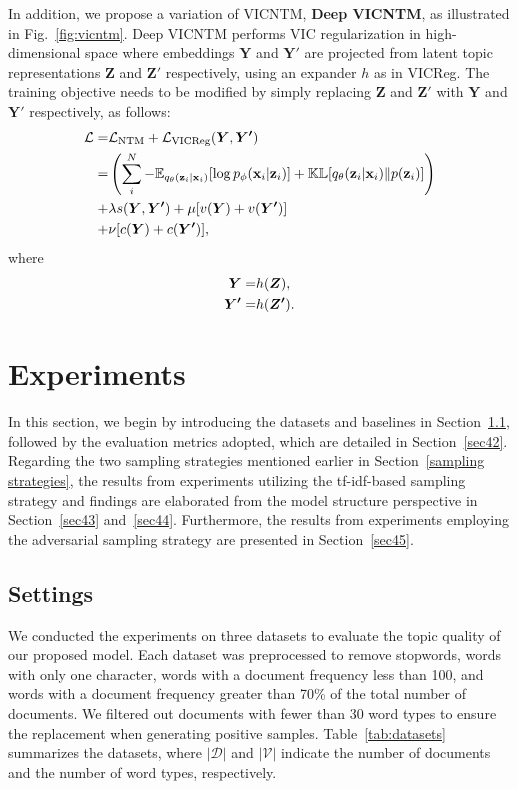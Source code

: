 \documentclass{article}
\begin{document}
In addition, we propose a variation of VICNTM, \textbf{Deep VICNTM}, as illustrated in Fig.~\ref{fig:vicntm}.
Deep VICNTM performs VIC regularization in high-dimensional space where embeddings $\boldsymbol{Y}$ and $\boldsymbol{Y'}$ are projected from latent topic representations $\boldsymbol{Z}$ and $\boldsymbol{Z'}$ respectively, using an expander $h$ as in VICReg.
The training objective needs to be modified by simply replacing $\boldsymbol{Z}$ and $\boldsymbol{Z'}$ with $\boldsymbol{Y}$ and $\boldsymbol{Y'}$ respectively, as follows:
\begin{eqnarray} \label{eq:deepvicntm}
    \mathcal{L} =& \mathcal{L}_{\text{NTM}} + \mathcal{L}_{\text{VICReg}}(\boldsymbol{Y},\boldsymbol{Y'}) \notag \\
    =& \left( \sum_{i}^{N} -\mathbb{E}_{q_{\theta}(\mathbf{z}_i|\mathbf{x}_i)}[\log p_{\phi}(\mathbf{x}_i|\mathbf{z}_i)]+\mathbb{KL}[q_\theta(\mathbf{z}_i|\mathbf{x}_i)\|p(\mathbf{z}_i)]\right) \notag \\
    +& \lambda s(\boldsymbol{Y},\boldsymbol{Y'}) +\mu [v(\boldsymbol{Y})+v(\boldsymbol{Y'})] \notag \\
    +& \nu [c(\boldsymbol{Y})+c(\boldsymbol{Y'})],
\end{eqnarray}
where
\begin{eqnarray*}
    \boldsymbol{Y} =& h(\boldsymbol{Z}), \\ \notag
    \boldsymbol{Y'} =& h(\boldsymbol{Z'}).
\end{eqnarray*}

\section{Experiments}\label{sec4}
In this section, we begin by introducing the datasets and baselines in Section~\ref{sec41}, followed by the evaluation metrics adopted, which are detailed in Section~\ref{sec42}. 
Regarding the two sampling strategies mentioned earlier in Section~\ref{sampling strategies}, the results from experiments utilizing the tf-idf-based sampling strategy and findings are elaborated from the model structure perspective in Section~\ref{sec43} and~\ref{sec44}. 
Furthermore, the results from experiments employing the adversarial sampling strategy are presented in Section~\ref{sec45}.

\subsection{Settings}\label{sec41}
We conducted the experiments on three datasets to evaluate the topic quality of our proposed model.
Each dataset was preprocessed to remove stopwords, words with only one character, words with a document frequency less than 100, and words with a document frequency greater than 70\% of the total number of documents. 
We filtered out documents with fewer than 30 word types to ensure the replacement when generating positive samples.
Table~\ref{tab:datasets} summarizes the datasets, where $|\mathcal{D}|$ and $|\mathcal{V}|$ indicate the number of documents and the number of word types, respectively.
\end{document}
